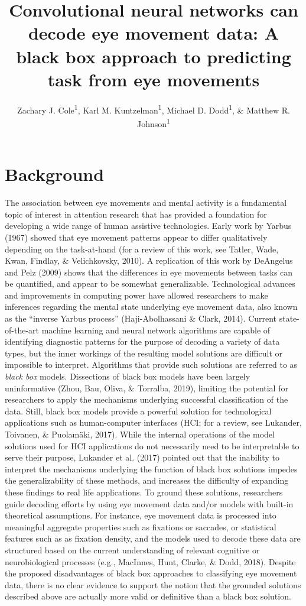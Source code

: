 \documentclass[
  english,
  man,floatsintext]{apa6}
\author{Zachary J. Cole\textsuperscript{1}, Karl M. Kuntzelman\textsuperscript{1}, Michael D. Dodd\textsuperscript{1}, \& Matthew R. Johnson\textsuperscript{1}}
\affiliation{
\vspace{0.5cm}
\textsuperscript{1} University of Nebraska-Lincoln}
\title{Convolutional neural networks can decode eye movement data: A black box approach to predicting task from eye movements}
\date{}
\begin{document}
\maketitle

\section{Background}

The association between eye movements and mental activity is a fundamental topic of interest in attention research that has provided a foundation for developing a wide range of human assistive technologies. Early work by Yarbus (1967) showed that eye movement patterns appear to differ qualitatively depending on the task-at-hand (for a review of this work, see Tatler, Wade, Kwan, Findlay, \& Velichkovsky, 2010). A replication of this work by DeAngelus and Pelz (2009) shows that the differences in eye movements between tasks can be quantified, and appear to be somewhat generalizable. Technological advances and improvements in computing power have allowed researchers to make inferences regarding the mental state underlying eye movement data, also known as the \enquote{inverse Yarbus process} (Haji-Abolhassani \& Clark, 2014). Current state-of-the-art machine learning and neural network algorithms are capable of identifying diagnostic patterns for the purpose of decoding a variety of data types, but the inner workings of the resulting model solutions are difficult or impossible to interpret. Algorithms that provide such solutions are referred to as \emph{black box} models. Dissections of black box models have been largely uninformative (Zhou, Bau, Oliva, \& Torralba, 2019), limiting the potential for researchers to apply the mechanisms underlying successful classification of the data. Still, black box models provide a powerful solution for technological applications such as human-computer interfaces (HCI; for a review, see Lukander, Toivanen, \& Puolamäki, 2017). While the internal operations of the model solutions used for HCI applications do not necessarily need to be interpretable to serve their purpose, Lukander et al. (2017) pointed out that the inability to interpret the mechanisms underlying the function of black box solutions impedes the generalizability of these methods, and increases the difficulty of expanding these findings to real life applications. To ground these solutions, researchers guide decoding efforts by using eye movement data and/or models with built-in theoretical assumptions. For instance, eye movement data is processed into meaningful aggregate properties such as fixations or saccades, or statistical features such as as fixation density, and the models used to decode these data are structured based on the current understanding of relevant cognitive or neurobiological processes (e.g., MacInnes, Hunt, Clarke, \& Dodd, 2018). Despite the proposed disadvantages of black box approaches to classifying eye movement data, there is no clear evidence to support the notion that the grounded solutions described above are actually more valid or definitive than a black box solution.
\end{document}
